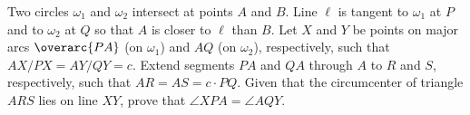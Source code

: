Two circles $\omega_1$ and $\omega_2$ intersect at points $A$ and $B$. Line $\ell$ is tangent to $\omega_1$ at $P$ and to $\omega_2$ at $Q$ so that $A$ is closer to $\ell$ than $B$. Let $X$ and $Y$ be points on major arcs $\overarc{PA}$ (on $\omega_1$) and $AQ$ (on $\omega_2$), respectively, such that $AX/PX = AY/QY = c$. Extend segments $PA$ and $QA$ through $A$ to $R$ and $S$, respectively, such that $AR = AS = c\cdot PQ$. Given that the circumcenter of triangle $ARS$ lies on line $XY$, prove that $\angle XPA = \angle AQY$.
